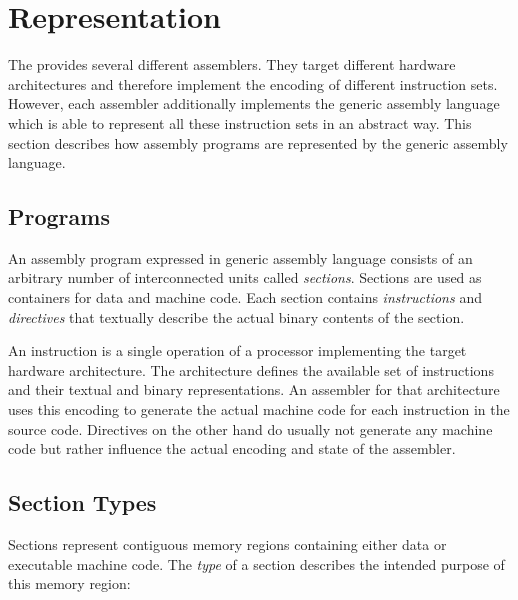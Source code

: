 \section{Representation}

The \ecs{} provides several different assemblers.
They target different hardware architectures and therefore implement the encoding of different instruction sets.
However, each assembler additionally implements the generic assembly language which is able to represent all these instruction sets in an abstract way.
This section describes how assembly programs are represented by the generic assembly language.

\subsection{Programs}

An assembly program expressed in generic assembly language consists of an arbitrary number of interconnected units called \emph{sections}.
Sections are used as containers for data and machine code.
Each section contains \emph{instructions} and \emph{directives} that textually describe the actual binary contents of the section.

An instruction is a single operation of a processor implementing the target hardware architecture.
The architecture defines the available set of instructions and their textual and binary representations.
An assembler for that architecture uses this encoding to generate the actual machine code for each instruction in the source code.
Directives on the other hand do usually not generate any machine code but rather influence the actual encoding and state of the assembler.

\subsection{Section Types}\label{sec:asmsectiontypes}

Sections represent contiguous memory regions containing either data or executable machine code.
The \emph{type} of a section describes the intended purpose of this memory region:

